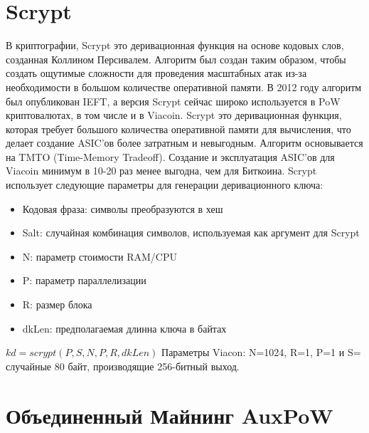 \documentclass{article}
\begin{document}
\section{Scrypt}\label{sec: Scrypt}
В криптографии, \cite{scrypt} Scrypt это деривационная функция на основе кодовых слов,
созданная Коллином Персивалем. Алгоритм был создан таким образом, чтобы
создать ощутимые сложности для проведения масштабных атак из-за необходимости в
большом количестве оперативной памяти. В 2012 году алгоритм был опубликован IEFT, а версия Scrypt сейчас широко
используется в PoW криптовалютах, в том числе и в Viacoin.
\newline \newline \noindent
Scrypt это деривационная функция, которая требует большого количества оперативной
памяти для вычисления, что делает создание ASIC'ов более затратным и невыгодным.
Алгоритм основывается на TMTO (Time-Memory Tradeoff). Создание и эксплуатация
ASIC'ов для Viacoin минимум в 10-20 раз менее выгодна, чем для Биткоина.
\newline \newline \noindent
Scrypt использует следующие параметры для генерации деривационного ключа:
\begin{itemize}
\item Кодовая фраза: символы преобразуются в хеш
\item Salt: случайная комбинация символов, используемая как аргумент для Scrypt
\item N: параметр стоимости RAM/CPU
\item P: параметр параллелизации
\item R: размер блока
\item dkLen: предполагаемая длинна ключа в байтах
\end{itemize}
$kd = scrypt(P, S, N, P, R, dkLen)$
\newline \newline \noindent
Параметры Viacon: N=1024, R=1, P=1 и S= случайные 80 байт, производящие 256-битный выход.

\section{Объединенный Майнинг AuxPoW}\label{sec:Merged Mining AuxPoW}
\end{document}
